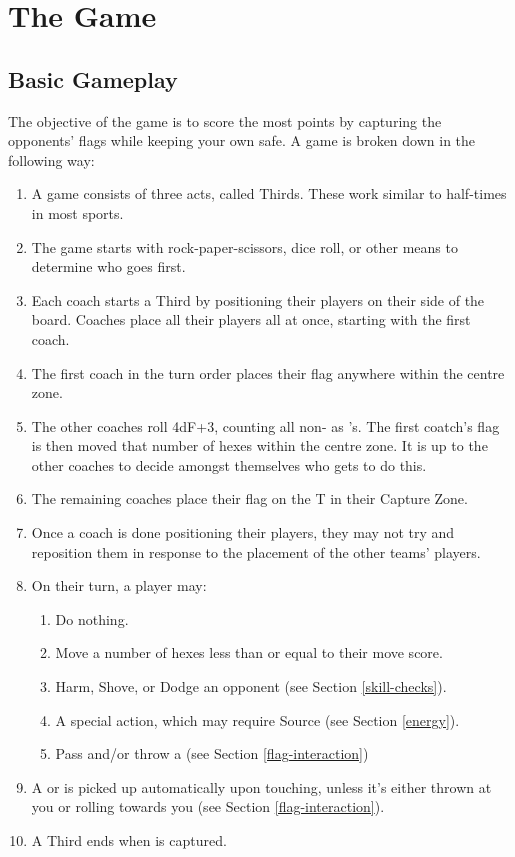 \chapter{The Game}
\section{Basic Gameplay} \label{basic-gameplay}
The objective of the game is to score the most points by capturing the opponents' flags while keeping your own safe.
A game is broken down in the following way:
\begin{enumerate}
    \item A game consists of three acts, called Thirds.
    These work similar to half-times in most sports.
    \item The game starts with rock-paper-scissors, dice roll, or other means to determine who goes first.
    \item Each coach starts a Third by positioning their players on their side of the board.
    Coaches place all their players all at once, starting with the first coach.
    \item The first coach in the turn order places their flag anywhere within the centre zone.
    \item The other coaches roll 4dF+3, counting all non-\blank{} as \plus{}'s. The first coatch's flag is then moved that number of hexes within the centre zone.
    It is up to the other coaches to decide amongst themselves who gets to do this.
    \item The remaining coaches place their flag on the T in their Capture Zone.
    \item Once a coach is done positioning their players, they may not try and reposition them in response to the placement of the other teams' players.
    \item On their turn, a player may:
    \begin{enumerate}
        \item Do nothing.
        \item Move a number of hexes less than or equal to their move score.
        \item Harm, Shove, or Dodge an opponent (see Section \ref{skill-checks}).
        \item A special action, which may require Source (see Section \ref{energy}).
        \item Pass \ball{} and/or throw a \flag{} (see Section \ref{flag-interaction})
    \end{enumerate}
    \item A \flag{} or \ball{} is picked up automatically upon touching, unless it’s either thrown at you or rolling towards you (see Section \ref{flag-interaction}).
    \item A Third ends when \ball{} is captured.
\end{enumerate}

